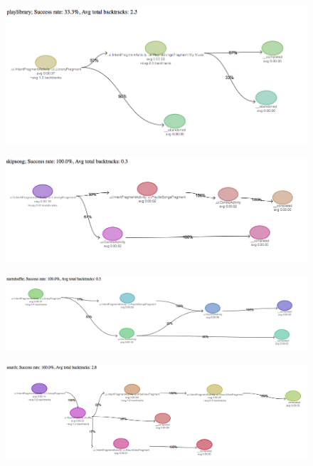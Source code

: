 \begin{figure}
\centering
\includegraphics[angle=90,height=\textheight]{images/results/playlibrary}
\end{figure}

\begin{figure}
\centering
\includegraphics[angle=90,height=\textheight]{images/results/skipsong}
\end{figure}

\begin{figure}
\centering
\includegraphics[angle=90,height=\textheight]{images/results/startshuffle}
\end{figure}

\begin{figure}
\centering
\includegraphics[angle=90,height=\textheight]{images/results/search}
\end{figure}

